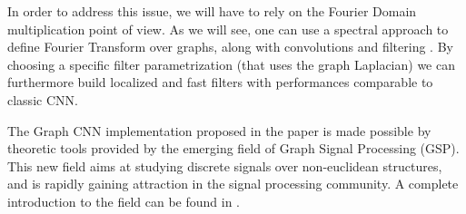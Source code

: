 In order to address this issue, we will have to rely on the Fourier Domain multiplication point of view. As we will see, one can use a spectral approach to define Fourier Transform over graphs, along with convolutions and filtering \cite{bruna2013spectral}. By choosing a specific filter parametrization (that uses the graph Laplacian) we can furthermore build localized and fast filters with performances comparable to classic CNN.

The Graph CNN implementation proposed in the paper is made possible by theoretic tools provided by the emerging field of Graph Signal Processing (GSP). This new field aims at studying discrete signals over non-euclidean structures, and is rapidly gaining attraction in the signal processing community. A complete introduction to the field can be found in \cite{Shuman2013}.


